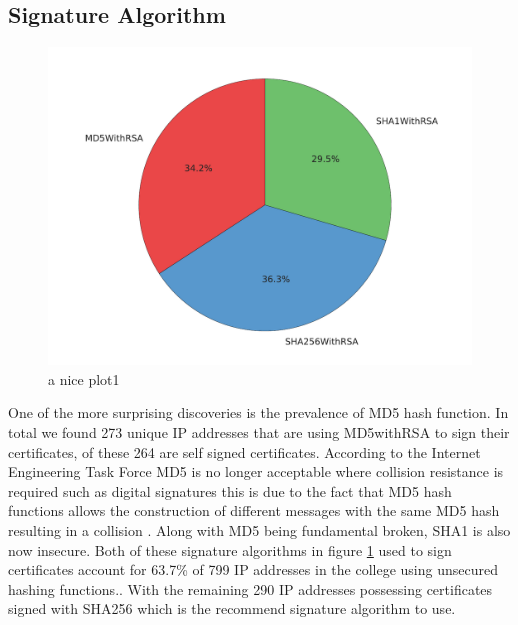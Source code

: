 \documentclass[a4wide,leqno,12pt]{report}
\begin{document}
\subsection{Signature Algorithm}
\begin{figure}[H]
\centering
\includegraphics[scale=.5]{pdf_images/signatureAlgorithms}
\caption{a nice plot1}
\label{fig:signatureAlgorithms}
\end{figure}

One of the more surprising discoveries is the prevalence of MD5 hash function. In total we found 273 unique IP addresses that are using MD5withRSA to sign their certificates, of these 264 are self signed certificates. According to the Internet Engineering Task Force MD5 is no longer acceptable where collision resistance is required
such as digital signatures \cite{turner2011updated} this is due to the fact that MD5 hash functions allows the construction of different messages with the same MD5 hash resulting in a collision \cite{md5}. Along with MD5 being fundamental broken, SHA1 is also now insecure. Both of these signature algorithms in figure \ref{fig:signatureAlgorithms} used to sign certificates account for 63.7\% of 799 IP addresses in the college using unsecured hashing functions.\cite{ssllabs}. With the remaining 290 IP addresses possessing certificates signed with SHA256 which is the recommend signature algorithm to use\cite{ssllabs}.
\end{document}
